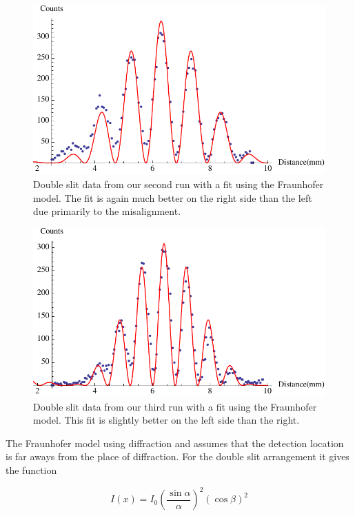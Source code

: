 \documentclass[prb,preprint]{revtex4-1}
\begin{document}
\begin{figure}[h!]
\centering
\includegraphics[width=6in]{doublefraun2.pdf}
\caption{Double slit data from our second run with a fit using the Fraunhofer model. The fit is again much better on the right side than the left due primarily to the misalignment.}
\label{doublefraun2}
\end{figure}

\begin{figure}[h!]
\centering
\includegraphics[width=6in]{doublefraun3.pdf}
\caption{Double slit data from our third run with a fit using the Fraunhofer model. This fit is slightly better on the left side than the right.}
\label{doublefraun3}
\end{figure}

The Fraunhofer model using diffraction and assumes that the detection location is far aways from the place of diffraction. For the double slit arrangement it gives the function

\begin{equation}
\label{fraunhofer}
I(x) = I_0 \left(\frac{\sin\alpha}{\alpha}\right)^2 \left(\cos\beta\right)^2
\end{equation}
\end{document}
